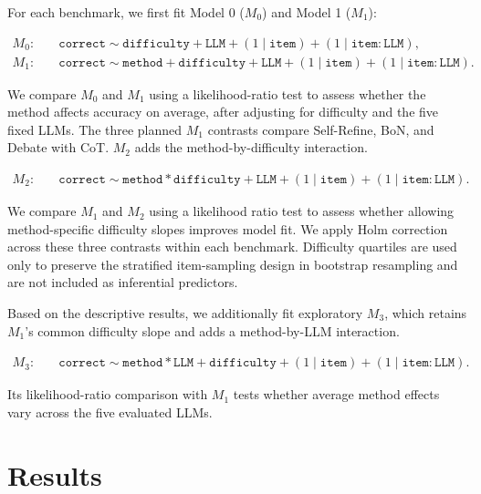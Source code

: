 \documentclass[a4paper]{article}
\theoremstyle{plain}
\theoremstyle{definition}
\theoremstyle{remark}
\begin{document}
For each benchmark, we first fit Model 0 ($M_0$) and Model 1 ($M_1$):

\medskip
{\small\noindent\(
\begin{aligned}
M_0:\quad &\texttt{correct} \sim \texttt{difficulty} + \texttt{LLM} + (1 \mid \texttt{item}) + (1 \mid \texttt{item}:\texttt{LLM}), \\
M_1:\quad &\texttt{correct} \sim \texttt{method} + \texttt{difficulty} + \texttt{LLM} + (1 \mid \texttt{item}) + (1 \mid \texttt{item}:\texttt{LLM}).
\end{aligned}
\)\par}
\medskip

We compare $M_0$ and $M_1$ using a likelihood-ratio test to assess whether the method affects accuracy on average, after adjusting for difficulty and the five fixed LLMs.
The three planned $M_1$ contrasts compare Self-Refine, BoN, and Debate with CoT.
$M_2$ adds the method-by-difficulty interaction.

\medskip
{\small\noindent\(
\begin{aligned}
M_2:\quad &\texttt{correct} \sim \texttt{method} * \texttt{difficulty} + \texttt{LLM} + (1 \mid \texttt{item}) + (1 \mid \texttt{item}:\texttt{LLM}).
\end{aligned}
\)\par}
\medskip

We compare $M_1$ and $M_2$ using a likelihood ratio test to assess whether allowing method-specific difficulty slopes improves model fit.
We apply Holm correction across these three contrasts within each benchmark.
Difficulty quartiles are used only to preserve the stratified item-sampling design in bootstrap resampling and are not included as inferential predictors.

Based on the descriptive results, we additionally fit exploratory $M_3$, which retains $M_1$'s common difficulty slope and adds a method-by-LLM interaction.

\medskip
{\small\noindent\(
\begin{aligned}
M_3:\quad &\texttt{correct} \sim \texttt{method} * \texttt{LLM} + \texttt{difficulty} + (1 \mid \texttt{item}) + (1 \mid \texttt{item}:\texttt{LLM}).
\end{aligned}
\)\par}
\medskip

Its likelihood-ratio comparison with $M_1$ tests whether average method effects vary across the five evaluated LLMs.

\section{Results}
\label{results}
\end{document}
